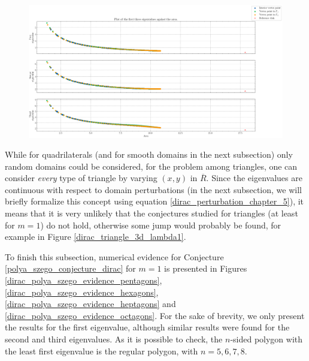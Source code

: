 \begin{figure}[!htb]
    \centering
    \includegraphics[width=\linewidth]{Images/Dirac/triangles/triangle_perimeter_first_eigenvalues.png}
    \label{dirac_triangle_model_perimeter}
\end{figure}

While for quadrilaterals (and for smooth domains in the next subsection) only random domains could be considered, for the problem among triangles, one can consider \textit{every} type of triangle by varying \((x,y)\) in \(\overline{R}\). Since the eigenvalues are continuous with respect to domain perturbations (in the next subsection, we will briefly formalize this concept using equation \eqref{dirac_perturbation_chapter_5}), it means that it is very unlikely that the conjectures studied for triangles (at least for \(m=1\)) do not hold, otherwise some jump would probably be found, for example in Figure \ref{dirac_triangle_3d_lambda1}.

To finish this subsection, numerical evidence for Conjecture \ref{polya_szego_conjecture_dirac} for \(m=1\) is presented in Figures \ref{dirac_polya_szego_evidence_pentagons}, \ref{dirac_polya_szego_evidence_hexagons}, \ref{dirac_polya_szego_evidence_heptagons} and \ref{dirac_polya_szego_evidence_octagons}. For the sake of brevity, we only present the results for the first eigenvalue, although similar results were found for the second and third eigenvalues. As it is possible to check, the \(n\)-sided polygon with the least first eigenvalue is the regular polygon, with \(n=5,6,7,8\).

